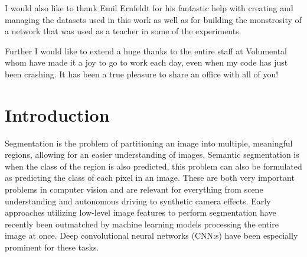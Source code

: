 \documentclass{kththesis}
\begin{document}
I would also like to thank Emil Ernfeldt for his fantastic help with creating and
managing the datasets used in this work as well as for building the monstrosity
of a network that was used as a teacher in some of the experiments.

Further I would like to extend a huge thanks to the entire staff at Volumental whom have made it a joy to go to work
each day, even when my code has just been crashing. It has been a true pleasure to share an office with all of you!


\tableofcontents


\mainmatter


\chapter{Introduction}



Segmentation is the problem of partitioning an image into multiple, meaningful
regions, allowing for an easier understanding of images. Semantic segmentation
is when the class of the region is also predicted, this problem can also be
formulated as predicting the class of each pixel in an image. These are both
very important problems in computer vision and are relevant for everything from
scene understanding and autonomous driving to synthetic camera effects. Early
approaches utilizing low-level image features to perform segmentation have
recently been outmatched by machine learning models processing the entire image
at once. Deep convolutional neural networks (CNN:s) have been especially
prominent for these tasks.
\end{document}
